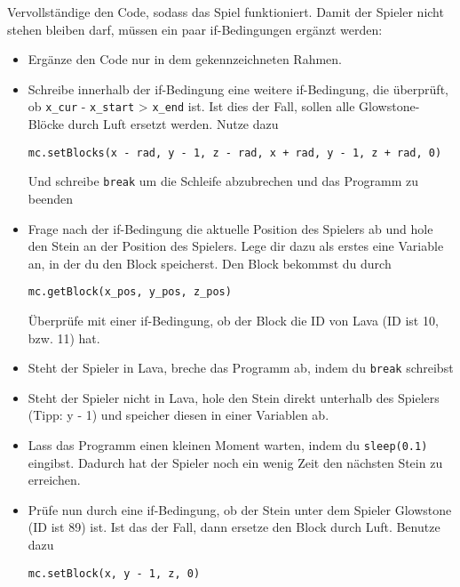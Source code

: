 \large Vervollständige den Code, sodass das Spiel funktioniert. Damit der Spieler nicht stehen bleiben darf, müssen ein paar if-Bedingungen ergänzt werden:
\begin{itemize}
	\item Ergänze den Code nur in dem gekennzeichneten Rahmen.
	
	\item Schreibe innerhalb der if-Bedingung eine weitere if-Bedingung, die überprüft, ob \texttt{x\_cur} - \texttt{x\_start} > \texttt{x\_end} ist. Ist dies der Fall, sollen alle Glowstone-Blöcke durch Luft ersetzt werden. Nutze dazu
	\begin{lstlisting}
mc.setBlocks(x - rad, y - 1, z - rad, x + rad, y - 1, z + rad, 0)
	\end{lstlisting}
	Und schreibe	\texttt{break} um die Schleife abzubrechen und das Programm zu beenden
			
	\item Frage nach der if-Bedingung die aktuelle Position des Spielers ab und hole den Stein an der Position des Spielers. Lege dir dazu als erstes eine Variable an, in der du den Block speicherst. Den Block bekommst du durch
	\begin{lstlisting}
mc.getBlock(x_pos, y_pos, z_pos)
	\end{lstlisting}
	Überprüfe mit einer if-Bedingung, ob der Block die ID von Lava (ID ist 10, bzw. 11) hat.
	
	\item Steht der Spieler in Lava, breche das Programm ab, indem du \texttt{break} schreibst
	
	\item Steht der Spieler nicht in Lava, hole den Stein direkt unterhalb des Spielers (Tipp: y - 1) und speicher diesen in einer Variablen ab.
	
	\item Lass das Programm einen kleinen Moment warten, indem du \texttt{sleep(0.1)} eingibst. Dadurch hat der Spieler noch ein wenig Zeit den nächsten Stein zu erreichen.
	
	\item Prüfe nun durch eine if-Bedingung, ob der Stein unter dem Spieler Glowstone (ID ist 89) ist. Ist das der Fall, dann ersetze den Block durch Luft. Benutze dazu
	\begin{lstlisting}
mc.setBlock(x, y - 1, z, 0)
	\end{lstlisting}
\end{itemize}